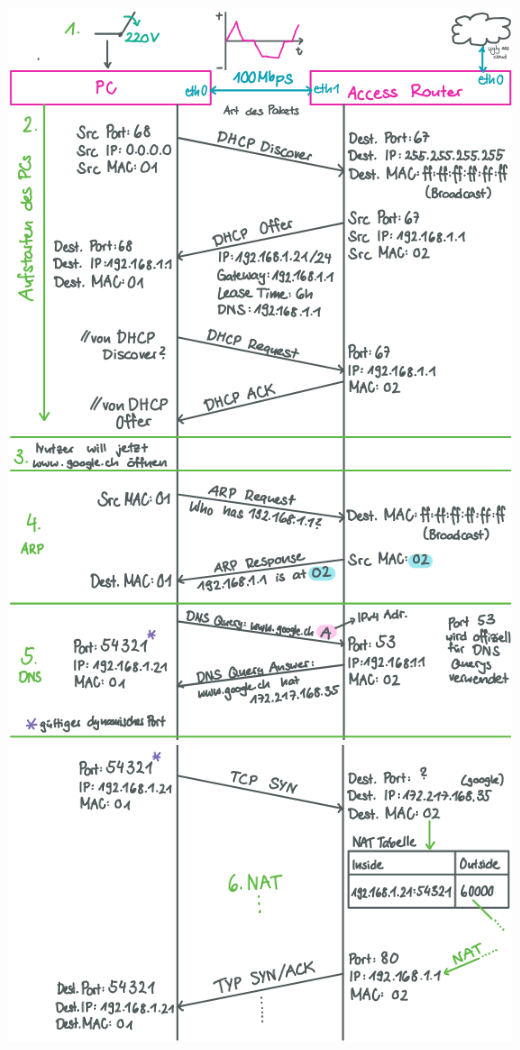 \includegraphics[width=1\linewidth]{images/atoz1.png}\\
\includegraphics[width=1\linewidth]{images/atoz2.png}



